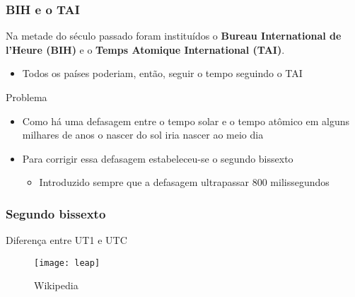 \documentclass[Ligatures=TeX,table,brazil,svgnames,usetotalslideindicator,compress,10pt]{beamer}
\begin{document}
\begin{frame}
  \frametitle{BIH e o TAI} Na metade do século passado foram
  instituídos o \textbf{Bureau International de l'Heure (BIH)} e o
  \textbf{Temps Atomique International (TAI)}.
  \begin{itemize}
  \item Todos os países poderiam, então, seguir o tempo seguindo o TAI
  \end{itemize}
  \begin{alertblock}{Problema}
    \begin{itemize}
    \item Como há uma defasagem entre o tempo solar e o tempo atômico
      em alguns milhares de anos o nascer do sol iria nascer ao meio dia
    \item Para corrigir essa defasagem estabeleceu-se o \alert{segundo bissexto}
      \begin{itemize}
      \item Introduzido sempre que a defasagem ultrapassar 800 milissegundos
      \end{itemize}
    \end{itemize}
  \end{alertblock}
\end{frame}

\begin{frame}
  \frametitle{Segundo bissexto}
    \begin{block}{Diferença entre UT1 e UTC}
    \begin{figure}
      \centering
      \vspace{-1em}
      \texttt{[image: leap]}
      \vspace{-1em}\caption{Wikipedia}
    \end{figure}
  \end{block}

\end{frame}
\end{document}
